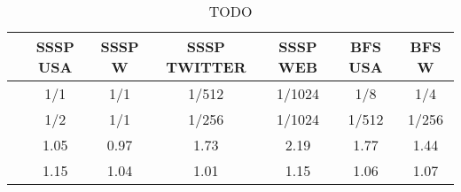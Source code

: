 \begin{table}[h]
\centring
\begin{tabular}{ |c|c|c|c|c|c|c| }
\hline
 & \large{\textbf{SSSP USA}} & \large{\textbf{SSSP W}} & \large{\textbf{SSSP TWITTER}} & \large{\textbf{SSSP WEB}} & \large{\textbf{BFS USA}} & \large{\textbf{BFS W}} \\
\hline
\insprob{} & 1/1 & 1/1 & 1/512 & 1/1024 & 1/8 & 1/4 \\
\hline
\delprob{} & 1/2 & 1/1 & 1/256 & 1/1024 & 1/512 & 1/256 \\
\hline
\speed{} & 1.05 & 0.97 & 1.73 & 2.19 & 1.77 & 1.44 \\
\hline
\workinc{} & 1.15 & 1.04 & 1.01 & 1.15 & 1.06 & 1.07 \\
\hline
\end{tabular}
\vspace{0.3em}
\caption{TODO }
\label{table:todo}
\end{table}
